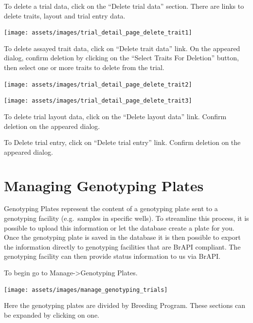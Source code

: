 \documentclass[
  12pt,
]{book}
\begin{document}
To delete a trial data, click on the ``Delete trial data'' section. There are links to delete traits, layout and trial entry data.

\begin{center}\texttt{[image: assets/images/trial\_detail\_page\_delete\_trait1]} \end{center}

To delete assayed trait data, click on ``Delete trait data'' link. On the appeared dialog, confirm deletion by clicking on the ``Select Traits For Deletion'' button, then select one or more traits to delete from the trial.

\begin{center}\texttt{[image: assets/images/trial\_detail\_page\_delete\_trait2]} \end{center}

\begin{center}\texttt{[image: assets/images/trial\_detail\_page\_delete\_trait3]} \end{center}

To delete trial layout data, click on the ``Delete layout data'' link. Confirm deletion on the appeared dialog.

To Delete trial entry, click on ``Delete trial entry'' link. Confirm deletion on the appeared dialog.

\hypertarget{managing-genotyping-plates}{%
\chapter{Managing Genotyping Plates}\label{managing-genotyping-plates}}

Genotyping Plates represent the content of a genotyping plate sent to a genotyping facility (e.g.~samples in specific wells). To streamline this process, it is possible to upload this information or let the database create a plate for you. Once the genotyping plate is saved in the database it is then possible to export the information directly to genotyping facilities that are BrAPI compliant. The genotyping facility can then provide status information to us via BrAPI.

To begin go to Manage-\textgreater Genotyping Plates.

\begin{center}\texttt{[image: assets/images/manage\_genotyping\_trials]} \end{center}

Here the genotyping plates are divided by Breeding Program. These sections can be expanded by clicking on one.
\end{document}
